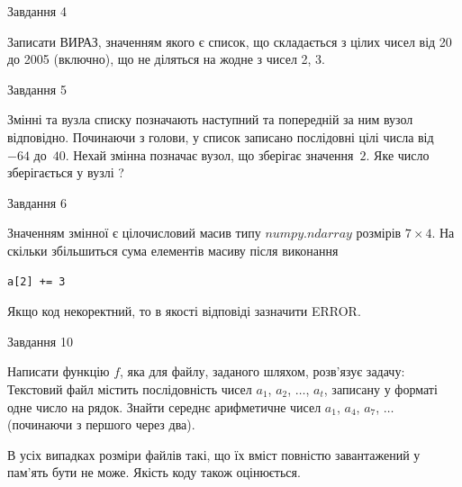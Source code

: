 \documentclass[12pt, ukrainian]{article}
\begin{document}
{\begin{minipage}[t]{8.0cm}
\end{minipage}


               
{\begin{center}Завдання {4}\end{center}}
\vspace{-4mm}

Записати ВИРАЗ, значенням якого є список, що складається з цілих чисел від 20 до 2005 (включно), що не діляться на жодне з чисел 2, 3.\par

\vspace{10mm}
               
{\begin{center}Завдання {5}\end{center}}
\vspace{-4mm}
Змінні  та  вузла списку позначають наступний та попередній за ним вузол відповідно. Починаючи з голови, у список записано послідовні цілі числа від~$-64$ до~$40$. Нехай змінна  позначає вузол, що зберігає значення~$2$.
Яке число зберігається у вузлі  ?\par

               
{\begin{center}Завдання {6}\end{center}}
\vspace{-4mm}
Значенням змінної  є цілочисловий масив типу $numpy.ndarray$ розмірів $7{\times}4$. На скільки збільшиться сума елементів масиву  після виконання
\begin{verbatim}
a[2] += 3
\end{verbatim}


Якщо код некоректний, то в якості відповіді зазначити ERROR.\par

               
{\begin{center}Завдання {10}\end{center}}
\vspace{-4mm}

Написати функцію $f$, яка для файлу, заданого шляхом, розв’язує задачу:\\ Текстовий файл містить послідовність чисел $a_1$, $a_2$, $\ldots$, $a_t$, записану у форматі одне число на рядок. Знайти середнє арифметичне чисел $a_1$, $a_4$, $a_7$, $\ldots$ (починаючи з першого через два).

В усіх випадках розміри файлів такі, що їх вміст повністю завантажений у пам'ять бути не може. Якість коду також оцінюється.



}
\end{document}
